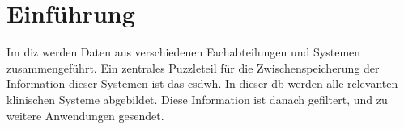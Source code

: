 \chapter{Einführung}

Im \ac{diz} werden Daten aus verschiedenen Fachabteilungen und Systemen zusammengeführt. Ein zentrales Puzzleteil für die Zwischenspeicherung der Information dieser Systemen ist das \acf{csdwh}. In dieser \ac{db} werden alle relevanten klinischen Systeme abgebildet. Diese Information ist danach gefiltert, und zu weitere Anwendungen gesendet.